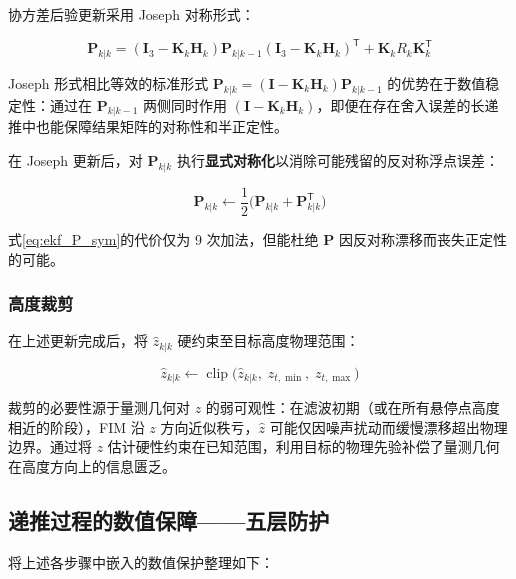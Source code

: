 协方差后验更新采用 Joseph 对称形式：

\begin{equation}
\mathbf{P}_{k|k} = (\mathbf{I}_3 - \mathbf{K}_k \mathbf{H}_k) \mathbf{P}_{k|k-1} (\mathbf{I}_3 - \mathbf{K}_k \mathbf{H}_k)^{\mathsf{T}} + \mathbf{K}_k R_k \mathbf{K}_k^{\mathsf{T}}
\label{eq:ekf_P_post}
\end{equation}

Joseph 形式相比等效的标准形式 $\mathbf{P}_{k|k} = (\mathbf{I} - \mathbf{K}_k \mathbf{H}_k) \mathbf{P}_{k|k-1}$ 的优势在于数值稳定性：通过在 $\mathbf{P}_{k|k-1}$ 两侧同时作用 $(\mathbf{I} - \mathbf{K}_k \mathbf{H}_k)$，即便在存在舍入误差的长递推中也能保障结果矩阵的对称性和半正定性。

在 Joseph 更新后，对 $\mathbf{P}_{k|k}$ 执行\textbf{显式对称化}以消除可能残留的反对称浮点误差：

\begin{equation}
\mathbf{P}_{k|k} \leftarrow \frac{1}{2}\bigl( \mathbf{P}_{k|k} + \mathbf{P}_{k|k}^{\mathsf{T}} \bigr)
\label{eq:ekf_P_sym}
\end{equation}

式\eqref{eq:ekf_P_sym}的代价仅为 9 次加法，但能杜绝 $\mathbf{P}$ 因反对称漂移而丧失正定性的可能。

\subsubsection{高度裁剪}

在上述更新完成后，将 $\hat{z}_{k|k}$ 硬约束至目标高度物理范围：

\begin{equation}
\hat{z}_{k|k} \leftarrow \operatorname{clip}\bigl( \hat{z}_{k|k},\; z_{t,\min},\; z_{t,\max} \bigr)
\label{eq:ekf_z_clip}
\end{equation}

裁剪的必要性源于量测几何对 $z$ 的弱可观性：在滤波初期（或在所有悬停点高度相近的阶段），FIM 沿 $z$ 方向近似秩亏，$\hat{z}$ 可能仅因噪声扰动而缓慢漂移超出物理边界。通过将 $z$ 估计硬性约束在已知范围，利用目标的物理先验补偿了量测几何在高度方向上的信息匮乏。

\subsection{递推过程的数值保障——五层防护}

将上述各步骤中嵌入的数值保护整理如下：

